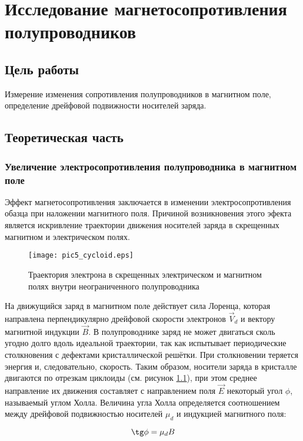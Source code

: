 \chapter{Исследование магнетосопротивления полупроводников}

\section{Цель работы}
Измерение изменения сопротивления полупроводников в магнитном поле, определение дрейфовой подвижности носителей заряда.

\section{Теоретическая часть}

\subsection{Увеличение электросопротивления полупроводника в магнитном поле}

Эффект магнетосопротивления заключается в изменении электросопротивления обазца при наложении магнитного поля. Причиной возникновения этого эфекта является искривление траектории движения носителей заряда в скрещенных магнитном и электрическом полях.

\begin{figure}[h!]\centering
\texttt{[image: pic5\_cycloid.eps]}
\caption{Траектория электрона в скрещенных электрическом и магнитном полях внутри неограниченного полупроводника}
\label{pic5_cycloid}
\end{figure}

На движущийся заряд в магнитном поле действует сила Лоренца, которая направлена перпендикулярно дрейфовой скорости электронов $\overrightarrow{V}_{d}$ и вектору магнитной индукции $\overrightarrow{B}$. В полупроводнике заряд не может двигаться сколь угодно долго вдоль идеальной траектории, так как испытывает периодические столкновения с дефектами кристаллической решётки. При столкновении теряется энергия и, следовательно, скорость. Таким образом, носители заряда в кристалле двигаются по отрезкам циклоиды (см. рисунок \ref{pic5_cycloid}), при этом среднее направление их движения составляет с направлением поля $\overrightarrow{E}$ некоторый угол $\phi$, называемый углом Холла. Величина угла Холла определяется соотношением между дрейфовой подвижностью носителей $\mu_{d} $ и индукцией магнитного поля:

\begin{equation}
\tg \phi = \mu_{d} B
\end{equation}

